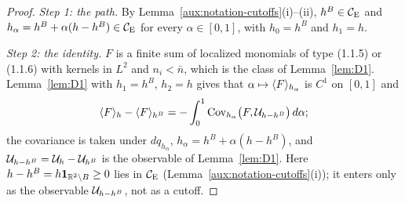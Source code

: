 \begin{proof}
\emph{Step 1: the path.}  By Lemma~\ref{aux:notation-cutoffs}(i)--(ii), $h^B\in\mathcal{C}_{\mathrm E}$ and
$h_\alpha=h^B+\alpha(h-h^B)\in\mathcal{C}_{\mathrm E}$ for every $\alpha\in[0,1]$, with $h_0=h^B$ and $h_1=h$.

\emph{Step 2: the identity.}  $F$ is a finite sum of localized monomials of type (1.1.5) or
(1.1.6) with kernels in $L^2$ and $n_i<\bar n$, which is the class of Lemma~\ref{lem:D1}.
Lemma~\ref{lem:D1} with $h_1=h^B$, $h_2=h$ gives that $\alpha\mapsto\langle F\rangle_{h_\alpha}$ is $C^1$
on $[0,1]$ and
\[
 \langle F\rangle_{h}-\langle F\rangle_{h^B}=-\int_0^1\operatorname{Cov}_{h_\alpha}\bigl(F,\mathcal U_{h-h^B}\bigr)\,d\alpha ;
\]
the covariance is taken under $dq_{h_\alpha}$, $h_\alpha=h^B+\alpha(h-h^B)$, and
$\mathcal U_{h-h^B}=\mathcal U_h-\mathcal U_{h^B}$ is the observable of Lemma~\ref{lem:D1}.  Here
$h-h^B=h\mathbf 1_{\mathbb{R}^2\setminus B}\ge0$ lies in $\mathcal{C}_{\mathrm E}$ (Lemma~\ref{aux:notation-cutoffs}(i)); it
enters only as the observable $\mathcal U_{h-h^B}$, not as a cutoff.


\end{proof}

